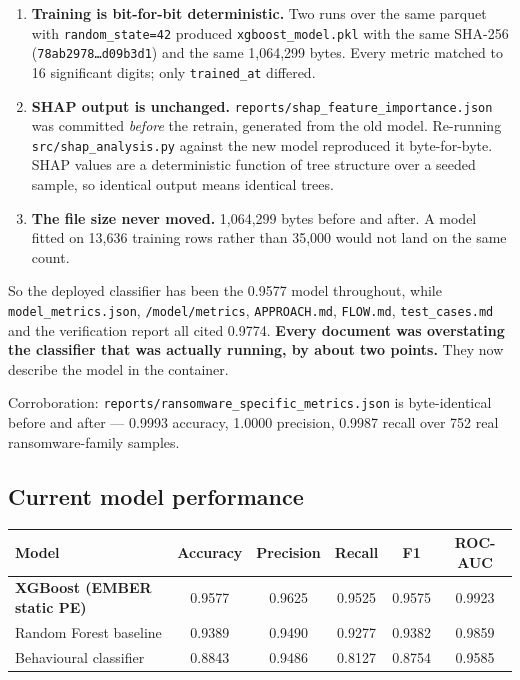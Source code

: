 \documentclass[11pt,a4paper]{article}
\begin{document}
\begin{enumerate}[leftmargin=*,itemsep=0.5em]
  \item \textbf{Training is bit-for-bit deterministic.} Two runs over the same parquet with
        \texttt{random\_state=42} produced \texttt{xgboost\_model.pkl} with the same SHA-256
        (\texttt{78ab2978\ldots d09b3d1}) and the same 1,064,299 bytes. Every metric matched
        to 16 significant digits; only \texttt{trained\_at} differed.
  \item \textbf{SHAP output is unchanged.} \texttt{reports/shap\_feature\_importance.json}
        was committed \emph{before} the retrain, generated from the old model. Re-running
        \texttt{src/shap\_analysis.py} against the new model reproduced it byte-for-byte.
        SHAP values are a deterministic function of tree structure over a seeded sample,
        so identical output means identical trees.
  \item \textbf{The file size never moved.} 1,064,299 bytes before and after. A model fitted
        on 13,636 training rows rather than 35,000 would not land on the same count.
\end{enumerate}

So the deployed classifier has been the 0.9577 model throughout, while
\texttt{model\_metrics.json}, \texttt{/model/metrics}, \texttt{APPROACH.md}, \texttt{FLOW.md},
\texttt{test\_cases.md} and the verification report all cited 0.9774. \textbf{Every document
was overstating the classifier that was actually running, by about two points.}
They now describe the model in the container.

Corroboration: \texttt{reports/ransomware\_specific\_metrics.json} is byte-identical
before and after --- 0.9993 accuracy, 1.0000 precision, 0.9987 recall over 752 real
ransomware-family samples.

\subsection{Current model performance}

\begin{center}
\begin{tabular}{@{}lccccc@{}}
\toprule
\textbf{Model} & \textbf{Accuracy} & \textbf{Precision} & \textbf{Recall} & \textbf{F1} & \textbf{ROC-AUC} \\
\midrule
\textbf{XGBoost (EMBER static PE)} & 0.9577 & 0.9625 & 0.9525 & 0.9575 & 0.9923 \\
Random Forest baseline            & 0.9389 & 0.9490 & 0.9277 & 0.9382 & 0.9859 \\
Behavioural classifier            & 0.8843 & 0.9486 & 0.8127 & 0.8754 & 0.9585 \\
\bottomrule
\end{tabular}
\end{center}
\end{document}
